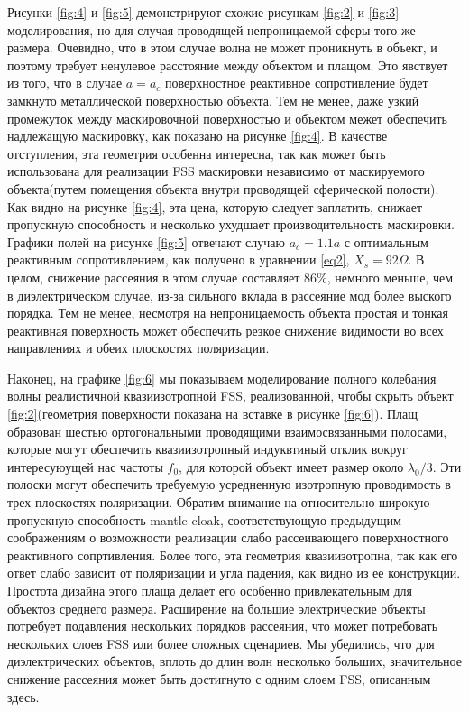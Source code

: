 \documentclass[12pt,a4paper]{article}
\begin{document}
Рисунки \ref{fig:4} и \ref{fig:5} демонстрируют схожие рисункам \ref{fig:2} и \ref{fig:3}
моделирования, но для случая проводящей непроницаемой сферы того же размера. Очевидно, что
в этом случае волна не может проникнуть в объект, и поэтому требует ненулевое расстояние
между объектом и плащом. Это явствует из того, что в случае $a=a_c$ поверхностное реактивное
сопротивление будет замкнуто металлической поверхностью объекта. Тем не менее, даже узкий
промежуток между маскировочной поверхностью и объектом межет обеспечить надлежащую 
маскировку, как показано на рисунке \ref{fig:4}. В качестве отступления, эта геометрия 
особенна интересна, так как может быть использована для реализации FSS маскировки
независимо от маскируемого объекта(путем помещения объекта внутри проводящей сферической 
полости). Как видно на рисунке \ref{fig:4}, эта цена, которую следует заплатить, снижает
пропускную способность и несколько ухудшает производительность маскировки. Графики полей
на рисунке \ref{fig:5} отвечают случаю $a_c=1.1a$ с оптимальным реактивным сопротивлением,
как получено в уравнении \ref{eq2}, $X_s=92\Omega$. В целом, снижение рассеяния в этом
случае составляет 86\%, немного меньше, чем в диэлектрическом случае, из-за сильного
вклада в рассеяние мод более выского порядка. Тем не менее, несмотря на непроницаемость 
объекта простая и тонкая реактивная поверхность может обеспечить резкое снижение видимости
во всех направлениях и обеих плоскостях поляризации.

Наконец, на графике \ref{fig:6} мы показываем моделирование полного колебания волны 
реалистичной квазиизотропной FSS, реализованной, чтобы скрыть объект \ref{fig:2}(геометрия
поверхности показана на вставке в рисунке \ref{fig:6}). Плащ образован шестью ортогональными
проводящими взаимосвязанными полосами, которые могут обеспечить квазиизотропный индуквтиный
отклик вокруг интересуюущей нас частоты $f_0$, для которой объект имеет размер около
$\lambda_0/3$. Эти полоски могут обеспечить требуемую усредненную изотропную проводимость
в трех плоскостях поляризации. Обратим внимание на относительно широкую пропускную 
способность mantle cloak, соответствующую предыдущим соображениям о возможности реализации
слабо рассеивающего поверхностного реактивного сопртивления. Более того, эта геометрия
квазиизотропна, так как его ответ слабо зависит от поляризации и угла падения, как видно
из ее конструкции. Простота дизайна этого плаща делает его особенно привлекательным для
объектов среднего размера. Расширение на большие электрические объекты потребует подавления
нескольких порядков рассеяния, что может потребовать нескольких слоев FSS или более сложных
сценариев. Мы убедились, что для диэлектрических объектов, вплоть до длин волн несколько
больших, значительное снижение рассеяния может быть достигнуто с одним слоем FSS, описанным
здесь.
\end{document}
